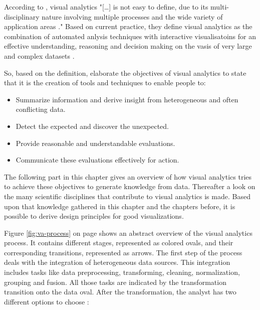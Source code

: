 According to \citeauthor{Keim2010}, visual analytics "[\ldots] is not easy to define, due to its multi-disciplinary nature involving multiple processes and the wide variety of application areas ." Based on current practice, they define visual analytics as the combination of automated anlysis techniques with interactive visualisatoins for an effective understanding, reasoning and decision making on the vasis of very large and complex datasets .

So, based on the definition, \citeauthor{Keim2010} elaborate the objectives of visual analytics to state that it is the creation of tools and techniques to enable people to:

\begin{itemize}
\item Summarize information and derive insight from heterogeneous and often conflicting data.
\item Detect the expected and discover the unexpected.
\item Provide reasonable and understandable evaluations.
\item Communicate these evaluations effectively for action.
\end{itemize}

The following part in this chapter gives an overview of how visual analytics tries to achieve these objectives to generate knowledge from data. Thereafter a look on the many scientific disciplines that contribute to visual analytics is made.
Based upon that knowledge gathered in this chapter and the chapters before, it is possible to derive design principles for good visualizations.

Figure \ref{fig:va-process} on page \pageref{fig:va-process} shows an abstract overview of the visual analytics process. It contains different stages, represented as colored ovals, and their corresponding transitions, represented as arrows. The first step of the process deals with the integration of heterogeneous data sources. This integration includes tasks like data preprocessing, transforming, cleaning, normalization, grouping and fusion. All those tasks are indicated by the transformation transition onto the data oval. After the transformation, the analyst has two different options to choose :

